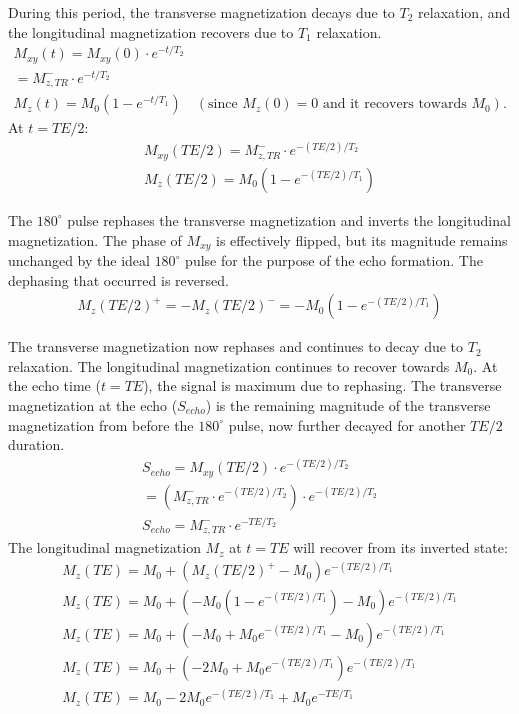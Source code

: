 \documentclass[10pt,a4paper,twoside]{article}
\begin{document}
During this period, the transverse magnetization decays due to $T_2$ relaxation, and the longitudinal magnetization recovers due to $T_1$ relaxation.
\begin{gather*}
M_{xy}(t) = M_{xy}(0) \cdot e^{-t/T_2} \\
= M_{z,TR}^- \cdot e^{-t/T_2} \\
M_z(t) = M_0(1 - e^{-t/T_1}) \quad (\text{since } M_z(0)=0 \text{ and it recovers towards } M_0).
\end{gather*}
At $t=TE/2$:
\begin{gather*}
M_{xy}(TE/2) = M_{z,TR}^- \cdot e^{-(TE/2)/T_2} \\
M_z(TE/2) = M_0(1 - e^{-(TE/2)/T_1})
\end{gather*}

\vspace{12pt}

The $180^\circ$ pulse rephases the transverse magnetization and inverts the longitudinal magnetization.
The phase of $M_{xy}$ is effectively flipped, but its magnitude remains unchanged by the ideal $180^\circ$ pulse for the purpose of the echo formation. The dephasing that occurred is reversed.
\begin{gather*}
M_z(TE/2)^+ = -M_z(TE/2)^- = -M_0(1 - e^{-(TE/2)/T_1})
\end{gather*}

\vspace{12pt}

The transverse magnetization now rephases and continues to decay due to $T_2$ relaxation. The longitudinal magnetization continues to recover towards $M_0$.
At the echo time ($t=TE$), the signal is maximum due to rephasing.
The transverse magnetization at the echo ($S_{echo}$) is the remaining magnitude of the transverse magnetization from before the $180^\circ$ pulse, now further decayed for another $TE/2$ duration.
\begin{gather*}
S_{echo} = M_{xy}(TE/2) \cdot e^{-(TE/2)/T_2} \\
= (M_{z,TR}^- \cdot e^{-(TE/2)/T_2}) \cdot e^{-(TE/2)/T_2} \\
S_{echo} = M_{z,TR}^- \cdot e^{-TE/T_2}
\end{gather*}
The longitudinal magnetization $M_z$ at $t=TE$ will recover from its inverted state:
\begin{gather*}
M_z(TE) = M_0 + (M_z(TE/2)^+ - M_0)e^{-(TE/2)/T_1} \\
M_z(TE) = M_0 + (-M_0(1 - e^{-(TE/2)/T_1}) - M_0)e^{-(TE/2)/T_1} \\
M_z(TE) = M_0 + (-M_0 + M_0 e^{-(TE/2)/T_1} - M_0)e^{-(TE/2)/T_1} \\
M_z(TE) = M_0 + (-2M_0 + M_0 e^{-(TE/2)/T_1})e^{-(TE/2)/T_1} \\
M_z(TE) = M_0 - 2M_0 e^{-(TE/2)/T_1} + M_0 e^{-TE/T_1}
\end{gather*}
\end{document}
